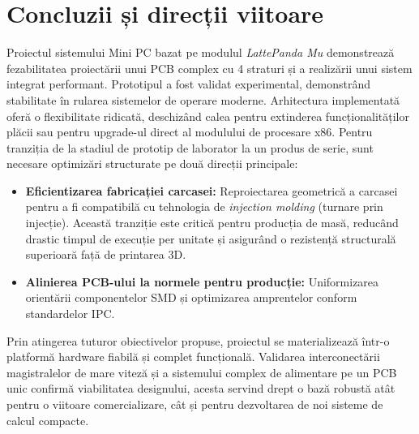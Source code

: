 \chapter{Concluzii și direcții viitoare}
\label{ch:concluzii}

Proiectul sistemului Mini PC bazat pe modulul \textit{LattePanda Mu} demonstrează fezabilitatea proiectării unui \ac{PCB} complex cu 4 straturi și a realizării unui sistem integrat performant. Prototipul a fost validat experimental, demonstrând stabilitate în rularea sistemelor de operare moderne. Arhitectura implementată oferă o flexibilitate ridicată, deschizând calea pentru extinderea funcționalităților plăcii sau pentru upgrade-ul direct al modulului de procesare x86.
Pentru tranziția de la stadiul de prototip de laborator la un produs de serie, sunt necesare optimizări structurate pe două direcții principale:

\begin{itemize}
    \item \textbf{Eficientizarea fabricației carcasei:} Reproiectarea geometrică a carcasei pentru a fi compatibilă cu tehnologia de \textit{injection molding} (turnare prin injecție). Această tranziție este critică pentru producția de masă, reducând drastic timpul de execuție per unitate și asigurând o rezistență structurală superioară față de printarea 3D.
    \item \textbf{Alinierea PCB-ului la normele pentru producție:} Uniformizarea orientării componentelor SMD și optimizarea amprentelor conform standardelor IPC. 
\end{itemize}

Prin atingerea tuturor obiectivelor propuse, proiectul se materializează într-o platformă hardware fiabilă și complet funcțională. Validarea interconectării magistralelor de mare viteză și a sistemului complex de alimentare pe un PCB unic confirmă viabilitatea designului, acesta servind drept o bază robustă atât pentru o viitoare comercializare, cât și pentru dezvoltarea de noi sisteme de calcul compacte.